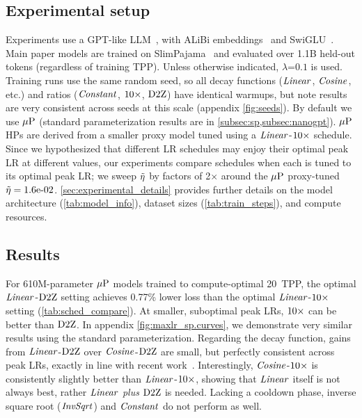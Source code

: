 \subsection{Experimental setup}

Experiments use a GPT-like LLM~\citep{radford2019gpt2}, with ALiBi
embeddings~\citep{press2022alibi} and SwiGLU~\citep{shazeer2020glu}.
Main paper models are trained on
SlimPajama~\citep{cerebras2023slimpajama} and evaluated over 1.1B
held-out tokens (regardless of training TPP).
%
Unless otherwise indicated, $\lambda$=$0.1$ is used.
%
Training runs use the same random seed, so all decay functions
($\mbox{\emph{Linear}}$, $\mbox{\emph{Cosine}}$, etc.) and ratios ($\mbox{\emph{Constant}}$, $\mbox{10}\times$,
$\mbox{D2Z}$) have identical warmups, but note results are very consistent
across seeds at this scale (appendix \cref{fig:seeds}).
%
By default we use $\mbox{$\mu$P}$ (standard parameterization results are in
\cref{subsec:sp,subsec:nanogpt}).  $\mbox{$\mu$P}$ HPs are derived from a
smaller proxy model tuned using a $\mbox{\emph{Linear}}$-$\mbox{10}\times$ schedule.
%
%
Since we hypothesized that different LR schedules may enjoy their
optimal peak LR at different values, our experiments compare schedules
when each is tuned to its optimal peak LR\@; we sweep $\tilde{\eta}$ by
factors of 2$\times$ around the $\mbox{$\mu$P}$ proxy-tuned $\tilde{\eta} = 1.6\mbox{e-}02$.
%
\cref{sec:experimental_details} provides further details on the model
architecture (\cref{tab:model_info}), dataset sizes
(\cref{tab:train_steps}), and compute resources.

\subsection{Results}




For 610M-parameter $\mbox{$\mu$P}$ models trained to compute-optimal 20~TPP,
the optimal $\mbox{\emph{Linear}}$-$\mbox{D2Z}$ setting achieves 0.77\% lower loss than
the optimal $\mbox{\emph{Linear}}$-$\mbox{10}\times$ setting (\cref{tab:sched_compare}).
At smaller, suboptimal peak LRs, $\mbox{10}\times$ can be better than $\mbox{D2Z}$.
%
In appendix \cref{fig:maxlr_sp.curves}, we demonstrate very
similar results using the standard parameterization.
%
Regarding the decay function, gains from $\mbox{\emph{Linear}}$-$\mbox{D2Z}$ over
$\mbox{\emph{Cosine}}$-$\mbox{D2Z}$ are small, but perfectly consistent across peak LRs,
exactly in line with recent
work~\citep{defazio2023when,lingle2024large}.
%
Interestingly, $\mbox{\emph{Cosine}}$-$\mbox{10}\times$ is consistently slightly better than
$\mbox{\emph{Linear}}$-$\mbox{10}\times$, showing that $\mbox{\emph{Linear}}$ itself is not always best,
rather $\mbox{\emph{Linear}}$ \emph{plus} $\mbox{D2Z}$ is needed.
%
Lacking a cooldown phase, inverse square root ($\mbox{\emph{InvSqrt}}$) and
$\mbox{\emph{Constant}}$ do not perform as well.
%

